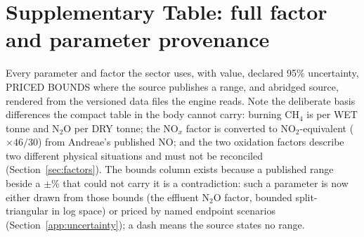 \section{Supplementary Table: full factor and parameter provenance}
\label{app:factors}

Every parameter and factor the sector uses, with value, declared 95\%
uncertainty, PRICED BOUNDS where the source publishes a range, and abridged
source, rendered from the versioned data files the engine reads. Note the
deliberate basis differences the compact table in the
body cannot carry: burning CH$_4$ is per WET tonne and N$_2$O per DRY tonne;
the NO$_x$ factor is converted to NO$_2$-equivalent ($\times 46/30$) from
Andreae's published NO; and the two oxidation factors describe two different
physical situations and must not be reconciled
(Section~\ref{sec:factors}). The bounds column exists because a published
range beside a $\pm$\% that could not
carry it is a contradiction: such a parameter is now either drawn from those bounds (the effluent N$_2$O factor,
bounded split-triangular in log space) or priced by named endpoint scenarios
(Section~\ref{app:uncertainty}); a dash means the source states no range.

